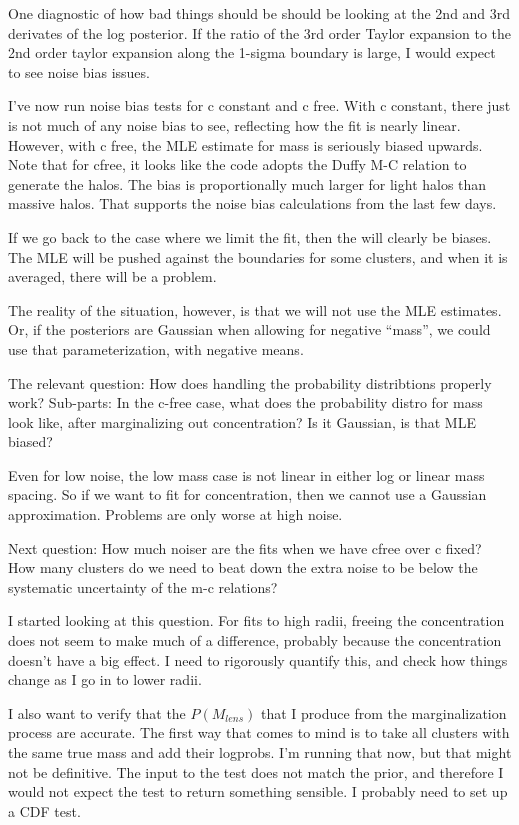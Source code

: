 \documentclass[11pt]{article}
\begin{document}
One diagnostic of how bad things should be should be looking at the 2nd and 3rd derivates of the log posterior. If the ratio of the 3rd order Taylor expansion to the 2nd order taylor expansion along the 1-sigma boundary is large, I would expect to see noise bias issues.


I've now run noise bias tests for c constant and c free. With c constant, there just is not much of any noise bias to see, reflecting how the fit is nearly linear. However, with c free, the MLE estimate for mass is seriously biased upwards. Note that for cfree, it looks like the code adopts the Duffy M-C relation to generate the halos. The bias is proportionally much larger for light halos than massive halos. That supports the noise bias calculations from the last few days.

If we go back to the case where we limit the fit, then the will clearly be biases. The MLE will be pushed against the boundaries for some clusters, and when it is averaged, there will be a problem.


The reality of the situation, however, is that we will not use the MLE estimates. Or, if the posteriors are Gaussian when allowing for negative ``mass'', we could use that parameterization, with negative means.

The relevant question: How does handling the probability distribtions properly work? Sub-parts: In the c-free case, what does the probability distro for mass look like, after marginalizing out concentration? Is it Gaussian, is that MLE biased?

Even for low noise, the low mass case is not linear in either log or linear mass spacing. So if we want to fit for concentration, then we cannot use a Gaussian approximation. Problems are only worse at high noise.

Next question: How much noiser are the fits when we have cfree over c fixed? How many clusters do we need to beat down the extra noise to be below the systematic uncertainty of the m-c relations?

I started looking at this question. For fits to high radii, freeing the concentration does not seem to make much of a difference, probably because the concentration doesn't have a big effect. I need to rigorously quantify this, and check how things change as I go in to lower radii.

I also want to verify that the $P(M_{lens})$ that I produce from the marginalization process are accurate. The first way that comes to mind is to take all clusters with the same true mass and add their logprobs. I'm running that now, but that might not be definitive. The input to the test does not match the prior, and therefore I would not expect the test to return something sensible. I probably need to set up a CDF test.
\end{document}
